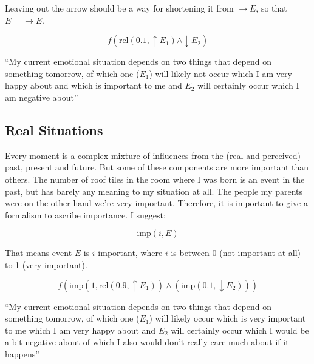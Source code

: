 \documentclass{scrartcl}
\begin{document}

Leaving out the arrow should be a way for shortening it from $\rightarrow E$, so that $E = \rightarrow E$.

\begin{equation} f \left( \textrm{rel}(0.1, \uparrow E_1) \wedge \downarrow E_2 \right) \end{equation}

``My current emotional situation depends on two things that depend on something tomorrow, of which one ($E_1$) will likely not
occur which I am very happy about and which is important to me and $E_2$ will certainly occur which I am negative about''

\subsection{Real Situations}

Every moment is a complex mixture of influences from the (real and perceived) past, present and future. But some
of these components are more important than others. The number of roof tiles in the room where I was born is
an event in the past, but has barely any meaning to my situation at all. The people my parents were on the other
hand we're very important. Therefore, it is important to give a formalism to ascribe importance. I suggest:

\begin{equation} \textrm{imp}(i, E) \end{equation}

That means event $E$ is $i$ important, where $i$ is between 0 (not important at all) to 1 (very important).

\begin{equation} 
	f \left(
		\textrm{imp}\left(
			1, \textrm{rel}\left(
				0.9, \uparrow E_1
			\right)
		\right)
		\wedge
		\left(
			\textrm{imp}\left(
				0.1, \downarrow E_2
			\right)
		\right)
	\right)
\end{equation}

``My current emotional situation depends on two things that depend on something tomorrow, of which one ($E_1$) will likely
occur which is very important to me which I am very happy about and $E_2$ will certainly occur which I would be a bit negative about
of which I also would don't really care much about if it happens''
\end{document}
